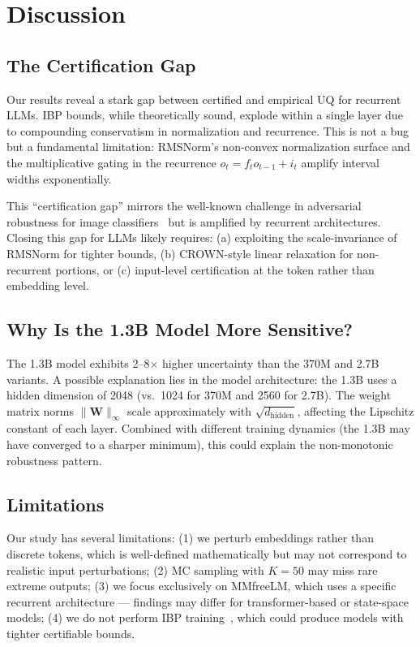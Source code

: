 \documentclass[11pt]{article}
\begin{document}
\section{Discussion}

\subsection{The Certification Gap}

Our results reveal a stark gap between certified and empirical UQ for recurrent LLMs. IBP bounds, while theoretically sound, explode within a single layer due to compounding conservatism in normalization and recurrence. This is not a bug but a fundamental limitation: RMSNorm's non-convex normalization surface and the multiplicative gating in the recurrence $o_t = f_t o_{t-1} + i_t$ amplify interval widths exponentially.

This ``certification gap'' mirrors the well-known challenge in adversarial robustness for image classifiers~\cite{zhang2020} but is amplified by recurrent architectures. Closing this gap for LLMs likely requires: (a) exploiting the scale-invariance of RMSNorm for tighter bounds, (b) CROWN-style linear relaxation for non-recurrent portions, or (c) input-level certification at the token rather than embedding level.

\subsection{Why Is the 1.3B Model More Sensitive?}

The 1.3B model exhibits 2--8$\times$ higher uncertainty than the 370M and 2.7B variants. A possible explanation lies in the model architecture: the 1.3B uses a hidden dimension of 2048 (vs.\ 1024 for 370M and 2560 for 2.7B). The weight matrix norms $\|\mathbf{W}\|_\infty$ scale approximately with $\sqrt{d_{\text{hidden}}}$, affecting the Lipschitz constant of each layer. Combined with different training dynamics (the 1.3B may have converged to a sharper minimum), this could explain the non-monotonic robustness pattern.

\subsection{Limitations}

Our study has several limitations: (1) we perturb embeddings rather than discrete tokens, which is well-defined mathematically but may not correspond to realistic input perturbations; (2) MC sampling with $K{=}50$ may miss rare extreme outputs; (3) we focus exclusively on MMfreeLM, which uses a specific recurrent architecture --- findings may differ for transformer-based or state-space models; (4) we do not perform IBP training~\cite{gowal2018}, which could produce models with tighter certifiable bounds.
\end{document}
